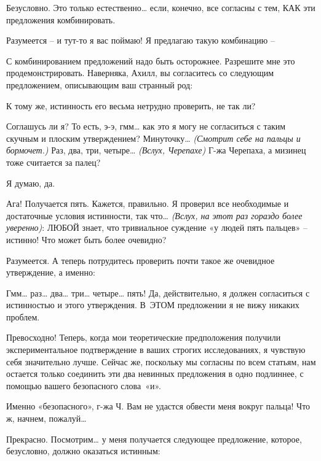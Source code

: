 \documentclass[../main.tex]{subfiles}
\begin{document}
\begin{Dialogue}
 Безусловно. Это только естественно\ldots{} если, конечно, все согласны с тем, КАК эти предложения комбинировать.

 Разумеется \--- и тут-то я вас поймаю! Я предлагаю такую комбинацию \---

 С комбинированием предложений надо быть осторожнее. Разрешите мне это продемонстрировать. Наверняка, Ахилл, вы согласитесь со следующим предложением, описывающим ваш странный род:


К тому же, истинность его весьма нетрудно проверить, не так ли?

 Соглашусь ли я? То есть, э-э, гмм\ldots{} как это я могу не согласиться с таким скучным и плоским утверждением? Минуточку\ldots{} \emph{(Смотрит себе на пальцы и бормочет.)} Раз, два, три, четыре\ldots{} \emph{(Вслух, Черепахе)} Г-жа Черепаха, а мизинец тоже считается за палец?

 Я думаю, да.

 Ага! Получается пять. Кажется, правильно. Я проверил все необходимые и достаточные условия истинности, так что\ldots{} \emph{(Вслух, на этот раз гораздо более уверенно)}: ЛЮБОЙ знает, что тривиальное суждение «у людей пять пальцев» \--- истинно! Что может быть более очевидно?

 Разумеется. А теперь потрудитесь проверить почти такое же очевидное утверждение, а именно:


 Гмм\ldots{} раз\ldots{} два\ldots{} три\ldots{} четыре\ldots{} пять! Да, действительно, я должен согласиться с истинностью и этого утверждения. В~ЭТОМ предложении я не вижу никаких проблем.

 Превосходно! Теперь, когда мои теоретические предположения получили экспериментальное подтверждение в ваших строгих исследованиях, я чувствую себя значительно лучше. Сейчас же, поскольку мы согласны по всем статьям, нам остается только соединить эти два невинных предложения в одно подлиннее, с помощью вашего безопасного слова~«и».

 Именно «безопасного», г-жа Ч\@. Вам не удастся обвести меня вокруг пальца! Что ж, начнем, пожалуй\ldots{}

 Прекрасно. Посмотрим\ldots{} у меня получается следующее предложение, которое, безусловно, должно оказаться истинным:


\end{Dialogue}
\end{document}
